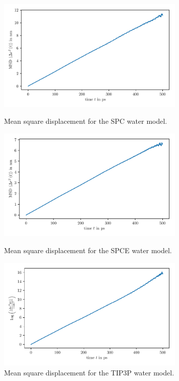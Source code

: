 \documentclass[a4paper,10pt,bibtotoc]{scrartcl}
\begin{document}
\begin{figure}[h]
\centering
 \includegraphics[width=0.8\textwidth]{MSD_SPC.pdf}
 \caption{Mean square displacement for the SPC water model.}
 \label{fig:fig_gromacs_4}
 \includegraphics[width=0.8\textwidth]{MSD_SPCE.pdf}
 \caption{Mean square displacement for the SPCE water model.}
 \label{fig:fig_gromacs_5}
 \includegraphics[width=0.8\textwidth]{MSD_TIP3P.pdf}
 \caption{Mean square displacement for the TIP3P water model.}
 \label{fig:fig_gromacs_6}
\end{figure}
\end{document}
